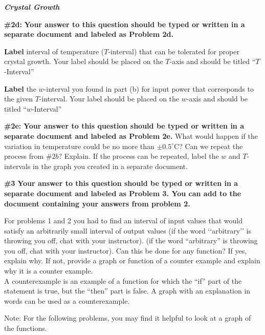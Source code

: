 \documentclass[handout,nooutcomes]{ximera}
\begin{document}
\begin{problem}{\textbf{\textit{Crystal Growth}}}
    \begin{problem}{\textbf{\#2d:}}
    \textbf{Your answer to this question should be typed or written in a separate document and labeled as Problem 2d.}
    
    \textbf{Label} interval of temperature ($T$-interval) that can be tolerated for proper crystal growth. Your label should be placed on the $T$-axis and should be titled ``$T$-Interval''
    
	\textbf{Label} the $w$-interval you found in part (b) for input power that corresponds to the given $T$-interval. Your label should be placed on the $w$-axis and should be titled ``$w$-Interval''
    \end{problem}
    
    \begin{problem}{\textbf{\#2e:}}
    \textbf{Your answer to this question should be typed or written in a separate document and labeled as Problem 2e.}
    What would happen if the variation in temperature could be no more than $\pm 0.5^\circ$C? Can we repeat the process from $\# 2b$? Explain. If the process can be repeated, label the $w$ and $T$-intervals in the graph you created in a separate document.
    \end{problem}
    
\end{problem}

\begin{problem}{\textbf{\#3}}
\textbf{Your answer to this question should be typed or written in a separate document and labeled as Problem 3. You can add to the document containing your answers from problem 2.}

For problems 1 and 2 you had to find an interval of input values that would satisfy an arbitrarily small interval of output values (if the word ‘‘arbitrary’’ is throwing you off, chat with your instructor).  (if the word ``arbitrary'' is throwing you off, chat with your instructor). Can this be done for any function? If yes, explain why. If not, provide a graph or function of a counter example and explain why it is a counter example. \\ A counterexample is an example of a function for which the ``if'' part of the statement is true, but the ``then'' part is false. A graph with an explanation in words can be used as a counterexample.
\end{problem}

Note: For the following problems, you may find it helpful to look at a graph of the functions.
\end{document}
